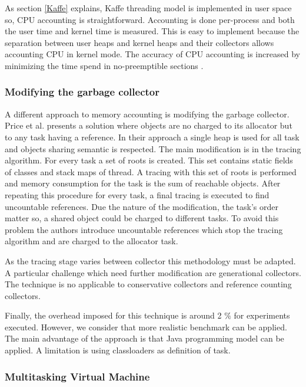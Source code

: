 As section \ref{Kaffe} explains, Kaffe threading model is implemented in user space so, CPU accounting is straightforward. Accounting is done per-process and both the user time and kernel time is measured. This is easy to implement because the separation between user heaps and kernel heaps and their collectors allows accounting CPU in kernel mode. The accuracy of CPU accounting is increased by minimizing the time spend in no-preemptible sections \cite{back_processes_2000}.

\subsubsection*{Modifying the garbage collector}
A different approach to memory accounting is modifying the garbage collector. Price et al. \cite{Price:2003:GCM:829515.830545} presents a solution where objects are no charged to its allocator but to any task having a reference. In their approach a single heap is used for all task and objects sharing semantic is respected. The main modification is in the tracing algorithm. For every task a set of roots is created. This set contains static fields of classes and stack maps of thread. A tracing with this set of roots is performed and memory consumption for the task is the sum of reachable objects. After repeating this procedure for every task, a final tracing is executed to find uncountable references. Due the nature of the modification, the task's order matter so, a shared object could be charged to different tasks. To avoid this problem the authors introduce uncountable references which stop the tracing algorithm and are charged to the allocator task.

As the tracing stage varies between collector this methodology must be adapted. A particular challenge which need further modification are generational collectors. The technique is no applicable to conservative collectors and reference counting collectors.

Finally, the overhead imposed for this technique is around 2 $\%$ for experiments executed. However, we consider that more realistic benchmark can be applied. The main advantage of the approach is that Java programming model can be applied. A limitation is using classloaders as definition of task.

\subsubsection*{Multitasking Virtual Machine}

